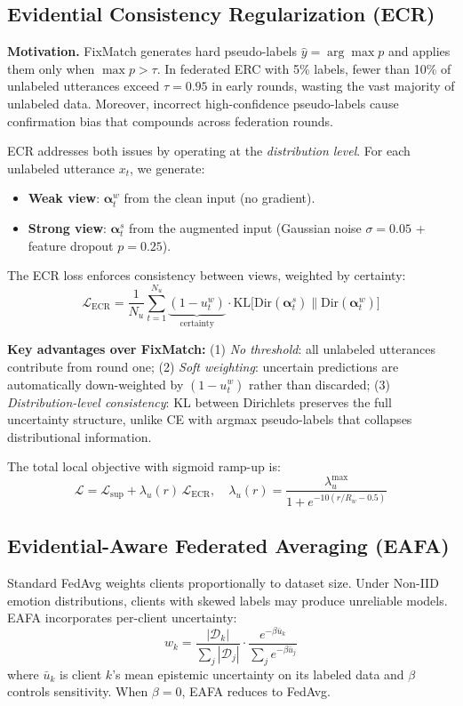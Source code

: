 \documentclass[letterpaper]{article}
\begin{document}
\subsection{Evidential Consistency Regularization (ECR)}

\textbf{Motivation.} FixMatch generates hard pseudo-labels $\hat{y} = \arg\max p$
and applies them only when $\max p > \tau$. In federated ERC with 5\% labels,
fewer than 10\% of unlabeled utterances exceed $\tau = 0.95$ in early rounds,
wasting the vast majority of unlabeled data. Moreover, incorrect high-confidence
pseudo-labels cause confirmation bias that compounds across federation rounds.

ECR addresses both issues by operating at the \textit{distribution level}. For
each unlabeled utterance $x_t$, we generate:
\begin{itemize}
\item \textbf{Weak view}: $\boldsymbol{\alpha}_t^w$ from the clean input (no gradient).
\item \textbf{Strong view}: $\boldsymbol{\alpha}_t^s$ from the augmented input
(Gaussian noise $\sigma{=}0.05$ + feature dropout $p{=}0.25$).
\end{itemize}
The ECR loss enforces consistency between views, weighted by certainty:
\begin{equation}
\mathcal{L}_{\text{ECR}} = \frac{1}{N_u} \sum_{t=1}^{N_u}
\underbrace{(1 - u_t^w)}_{\text{certainty}} \cdot
\text{KL}\big[\text{Dir}(\boldsymbol{\alpha}_t^s)
\| \text{Dir}(\boldsymbol{\alpha}_t^w)\big]
\end{equation}

\textbf{Key advantages over FixMatch:} (1) \textit{No threshold}: all unlabeled
utterances contribute from round one; (2) \textit{Soft weighting}: uncertain
predictions are automatically down-weighted by $(1{-}u_t^w)$ rather than
discarded; (3) \textit{Distribution-level consistency}: KL between Dirichlets
preserves the full uncertainty structure, unlike CE with argmax pseudo-labels
that collapses distributional information.

The total local objective with sigmoid ramp-up is:
\begin{equation}
\mathcal{L} = \mathcal{L}_{\text{sup}} + \lambda_u(r) \, \mathcal{L}_{\text{ECR}},
\quad \lambda_u(r) = \frac{\lambda_u^{\max}}{1 + e^{-10(r/R_w - 0.5)}}
\end{equation}

\subsection{Evidential-Aware Federated Averaging (EAFA)}
Standard FedAvg weights clients proportionally to dataset size. Under Non-IID
emotion distributions, clients with skewed labels may produce unreliable models.
EAFA incorporates per-client uncertainty:
\begin{equation}
w_k = \frac{|\mathcal{D}_k|}{\sum_j |\mathcal{D}_j|} \cdot
\frac{e^{-\beta \bar{u}_k}}{\sum_j e^{-\beta \bar{u}_j}}
\end{equation}
where $\bar{u}_k$ is client $k$'s mean epistemic uncertainty on its labeled data
and $\beta$ controls sensitivity. When $\beta{=}0$, EAFA reduces to FedAvg.
\end{document}
